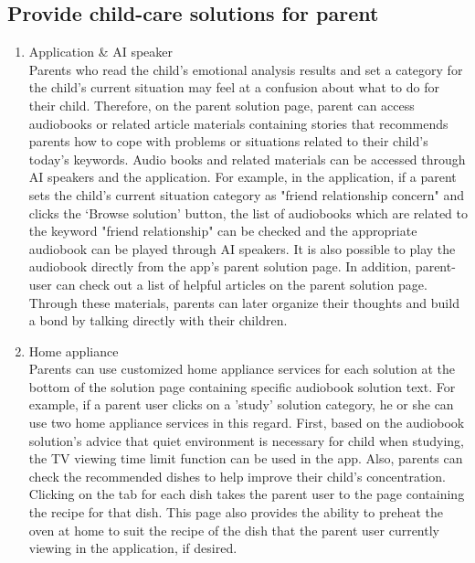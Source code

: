 \documentclass[conference]{IEEEtran}
\begin{document}
\subsection{Provide child-care solutions for parent}

\begin{enumerate}
\item Application \& AI speaker
\\
Parents who read the child's emotional analysis results and set a category for the child's current situation may feel at a confusion about what to do for their child. Therefore, on the parent solution page, parent can access audiobooks or related article materials containing stories that recommends parents how to cope with problems or situations related to their child's today’s keywords. Audio books and related materials can be accessed through AI speakers and the application. For example, in the application, if a parent sets the child's current situation category as "friend relationship concern" and clicks the ‘Browse solution’ button, the list of audiobooks which are related to the keyword "friend relationship" can be checked and the appropriate audiobook can be played through AI speakers. It is also possible to play the audiobook directly from the app's parent solution page. In addition, parent-user can check out a list of helpful articles on the parent solution page. Through these materials, parents can later organize their thoughts and build a bond by talking directly with their children.\\


  \item Home appliance
  \\
  Parents can use customized home appliance services for each solution at the bottom of the solution page containing specific audiobook solution text. For example, if a parent user clicks on a 'study' solution category, he or she can use two home appliance services in this regard. First, based on the audiobook solution's advice that quiet environment is necessary for child when studying, the TV viewing time limit function can be used in the app. Also, parents can check the recommended dishes to help improve their child's concentration. Clicking on the tab for each dish takes the parent user to the page containing the recipe for that dish. This page also provides the ability to preheat the oven at home to suit the recipe of the dish that the parent user currently viewing in the application, if desired.
  \\
\end{enumerate}
\newpage
\end{document}
